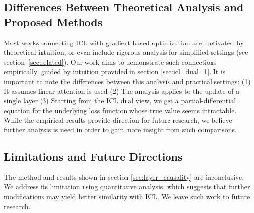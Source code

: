 \subsection{Differences Between Theoretical Analysis and Proposed Methods}
Most works connecting ICL with gradient based optimization are motivated by theoretical intuition, or even include rigorous analysis for simplified settings \cite{pmlr-v202-von-oswald23a, akyürek2023learning} (see section~\ref{sec:related}).
Our work aims to demonstrate such connections empirically, guided by intuition provided in section \ref{sec:icl_dual_1}.  
It is important to note the differences between this analysis and practical settings: (1) It assumes linear attention is used (2) The analysis applies to the update of a single layer
(3) Starting from the ICL dual view, we get a partial-differential equation for the underlying loss function whose true value seems intractable.
While the empirical results provide direction for future research, we believe further analysis is need in order to gain more insight from such comparisons. 

\subsection{Limitations and Future Directions}
The method and results shown in section \ref{sec:layer_causality} are inconclusive.
We address its limitation using quantitative analysis, which suggests that further modifications may yield better similarity with ICL.
We leave such work to future research.  